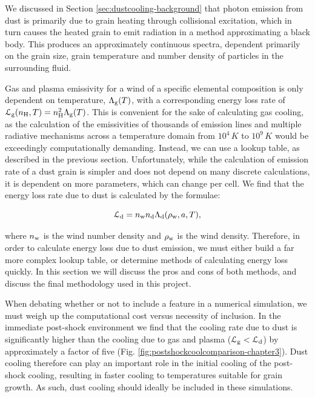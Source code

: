
We discussed in Section \ref{sec:dustcooling-background} that photon emission from dust is primarily due to grain heating through collisional excitation, which in turn causes the heated grain to emit radiation in a method approximating a black body.
This produces an approximately continuous spectra, dependent primarily on the grain size, grain temperature and number density of particles in the surrounding fluid.

Gas and plasma emissivity for a wind of a specific elemental composition is only dependent on temperature, $\Lambda_\text{g}(T)$, with a corresponding energy loss rate of $\mathcal{L}_\text{g} (n_\text{H},T) = n_\text{H}^2 \Lambda_\text{g}(T)$. 
This is convenient for the sake of calculating gas cooling, as the calculation of the emissivities of thousands of emission lines and multiple radiative mechanisms across a temperature domain from $10^4\, \si{K}$ to $10^9\,\si{K}$ would be exceedingly computationally demanding.
Instead, we can use a lookup table, as described in the previous section.
Unfortunately, while the calculation of emission rate of a dust grain is simpler and does not depend on many discrete calculations, it is dependent on more parameters, which can change per cell.
We find that the energy loss rate due to dust is calculated by the formulae:

\begin{equation}
  \mathcal{L}_\text{d} = n_\text{w} n_\text{d} \Lambda_\text{d}(\rho_\text{w},a,T) ,
\end{equation}

\noindent
where $n_\text{w}$ is the wind number density and $\rho_\text{w}$ is the wind density. 
Therefore, in order to calculate energy loss due to dust emission, we must either build a far more complex lookup table, or determine methods of calculating energy loss quickly.
In this section we will discuss the pros and cons of both methods, and discuss the final methodology used in this project.


When debating whether or not to include a feature in a numerical simulation, we must weigh up the computational cost versus necessity of inclusion.
In the immediate post-shock environment we find that the cooling rate due to dust is significantly higher than the cooling due to gas and plasma ($\mathcal{L}_\text{g} < \mathcal{L}_\text{d}$) by approximately a factor of five (Fig. \ref{fig:postshockcoolcomparison-chapter3}).
Dust cooling therefore can play an important role in the initial cooling of the post-shock cooling, resulting in faster cooling to temperatures suitable for grain growth.
As such, dust cooling should ideally be included in these simulations.

